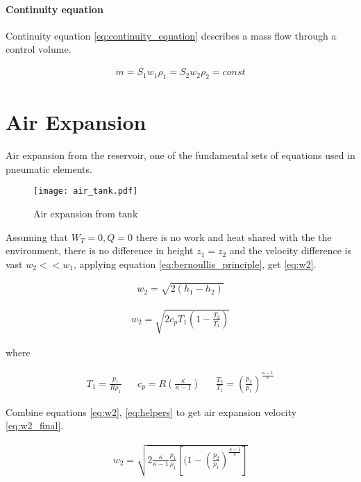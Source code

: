 \paragraph{Continuity equation}
Continuity equation \ref{eq:continuity_equation} describes a mass flow
through a control volume.

\begin{align}
    \dot{m} = S_1 w_1 \rho_1 = S_2 w_2 \rho_2 = const
    \label{eq:continuity_equation}
\end{align}

\section{Air Expansion}\label{sec:air_expansion}
Air expansion from the reservoir, one of the fundamental sets of equations
used in pneumatic elements. 

\begin{figure}[h!]
    \centering
    \texttt{[image: air\_tank.pdf]}
    \caption{Air expansion from tank}
    \label{fig:air_expansion}
\end{figure}

Assuming that $W_T = 0, Q = 0$ there is no work and heat shared with the
the environment, there is no difference in height $z_1 = z_2$ and
the velocity difference is vast $w_2 << w_1$, applying equation
\ref{eq:bernoullis_principle}, get \ref{eq:w2}.


\begin{align}
    w_2 = \sqrt{2(h_1 - h_2)}
    \label{eq:w2}
\end{align}

\begin{align}
    w_2 = \sqrt{2c_p T_1 \left(1-\frac{T_2}{T_1}\right)}
    \label{eq:w2}
\end{align}

where 

\begin{align}
    T_1 = \frac{p_1}{R \rho_1} && 
    c_p = R  \left( \frac{\kappa}{\kappa-1} \right)   &&
    \frac{T_2}{T_1} = \left(\frac{p_2}{p_1} \right)^{\frac{\kappa - 1}{\kappa}}
    \label{eq:helpers}
\end{align}

Combine equations \ref{eq:w2}, \ref{eq:helpers} to get air expansion
velocity \ref{eq:w2_final}.

\begin{align}
    w_2 =
    \sqrt{2 \frac{\kappa}{\kappa-1} \frac{p_1}{\rho_1} 
    \left[(1-\left(\frac{p_2}{p_1}\right)^\frac{\kappa-1}{\kappa}\right]}
    \label{eq:w2_final}
\end{align}

